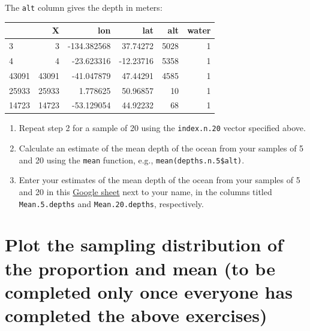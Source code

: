 \documentclass[letterpaper,10pt,twoside,]{pinp}
\begin{document}
\begin{Shaded}
\begin{Highlighting}[]
\NormalTok{ <-}\StringTok{ }\NormalTok{(}\NormalTok{, } \NormalTok{, } \NormalTok{)}
\end{Highlighting}
\end{Shaded}

The \texttt{alt} column gives the depth in meters:

\begin{longtable}[]{@{}lrrrrr@{}}
\toprule
& X & lon & lat & alt & water\tabularnewline
\midrule
\endhead
3 & 3 & -134.382568 & 37.74272 & 5028 & 1\tabularnewline
4 & 4 & -23.623316 & -12.23716 & 5358 & 1\tabularnewline
43091 & 43091 & -41.047879 & 47.44291 & 4585 & 1\tabularnewline
25933 & 25933 & 1.778625 & 50.96857 & 10 & 1\tabularnewline
14723 & 14723 & -53.129054 & 44.92232 & 68 & 1\tabularnewline
\bottomrule
\end{longtable}

\begin{enumerate}
\def\labelenumi{\arabic{enumi}.}
\setcounter{enumi}{2}
\item
  Repeat step 2 for a sample of 20 using the \texttt{index.n.20} vector
  specified above.
\item
  Calculate an estimate of the mean depth of the ocean from your samples
  of 5 and 20 using the \texttt{mean} function, e.g.,
  \texttt{mean(depths.n.5\$alt)}.
\item
  Enter your estimates of the mean depth of the ocean from your samples
  of 5 and 20 in this
  \href{https://docs.google.com/spreadsheets/d/1Mnxeq9nQcTdQycZ7S_62fYFiNC5_a3fibsyodzfwO58/edit?usp=sharing}{Google
  sheet} next to your name, in the columns titled \texttt{Mean.5.depths}
  and \texttt{Mean.20.depths}, respectively.
\end{enumerate}

\newpage

\hypertarget{plot-the-sampling-distribution-of-the-proportion-and-mean-to-be-completed-only-once-everyone-has-completed-the-above-exercises}{%
\section{Plot the sampling distribution of the proportion and mean (to
be completed only once everyone has completed the above
exercises)}\label{plot-the-sampling-distribution-of-the-proportion-and-mean-to-be-completed-only-once-everyone-has-completed-the-above-exercises}}
\end{document}
